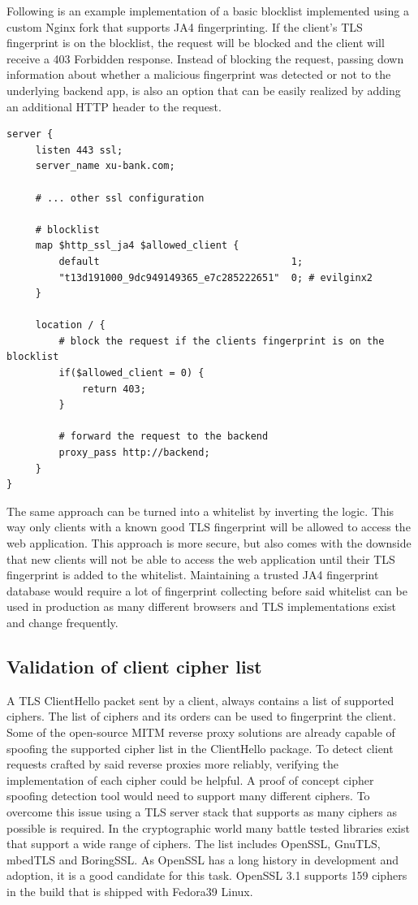 \documentclass[12pt]{scrbook}
\begin{document}
Following is an example implementation of a basic blocklist implemented using a
custom Nginx fork that supports JA4 fingerprinting. If the client's TLS fingerprint is on the
blocklist, the request will be blocked and the client will receive a 403
Forbidden response. Instead of blocking the request, passing down information
about whether a malicious fingerprint was detected or not to the underlying
backend app, is also an option that can be easily realized by adding an additional HTTP header to the request.

\begin{verbatim}
server {
     listen 443 ssl;
     server_name xu-bank.com;

     # ... other ssl configuration

     # blocklist
     map $http_ssl_ja4 $allowed_client {
         default                                 1;
         "t13d191000_9dc949149365_e7c285222651"  0; # evilginx2
     }

     location / {
         # block the request if the clients fingerprint is on the blocklist
         if($allowed_client = 0) {
             return 403;
         }

         # forward the request to the backend
         proxy_pass http://backend;
     }
}
\end{verbatim}

The same approach can be turned into a whitelist by inverting the logic. This
way only clients with a known good TLS fingerprint will be allowed to access the
web application. This approach is more secure, but also comes with the downside
that new clients will not be able to access the web application until their TLS
fingerprint is added to the whitelist. Maintaining a trusted JA4 fingerprint
database would require a lot of fingerprint collecting before said whitelist can
be used in production as many different browsers and TLS implementations exist
and change frequently.

\subsection{Validation of client cipher list} A TLS ClientHello packet sent
by a client, always contains a list of supported ciphers. The list of ciphers
and its orders can be used to fingerprint the client. Some of the open-source MITM
reverse proxy solutions are already capable of spoofing the supported cipher
list in the ClientHello package. To detect client requests crafted by said reverse
proxies more reliably, verifying the implementation of each cipher could be
helpful. A proof of concept cipher spoofing detection tool would need to support many
different ciphers. To overcome this issue using a TLS server stack that
supports as many ciphers as possible is required. In the cryptographic world
many battle tested libraries exist that support a wide range of ciphers.
The list includes OpenSSL, GnuTLS, mbedTLS and BoringSSL.
As OpenSSL has a long history in development and adoption, it is a good
candidate for this task. OpenSSL 3.1 supports 159 ciphers in the build that is shipped with Fedora39 Linux.
\end{document}
